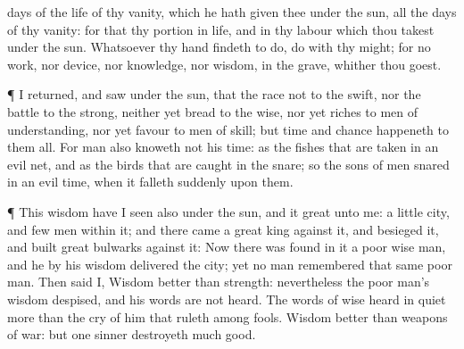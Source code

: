 {days of the
life of thy
vanity, which he hath
given thee under the
sun, all the
days of thy
vanity: for that
{} thy
portion in
{}
life, and in thy
labour which thou
takest under the
sun.
Whatsoever thy
hand
findeth to
do,
do
{} with thy
might; for
{} no
work, nor
device, nor
knowledge, nor
wisdom, in the
grave, whither thou
goest.
\par }{\PP {}¶ I
returned, and
saw under the
sun, that the
race
{} not to the
swift, nor the
battle to the
strong, neither yet
bread to the
wise, nor yet
riches to men of
understanding, nor yet
favour to men of
skill; but
time and
chance
happeneth to them all.
For
man also
knoweth not his
time: as the
fishes that are
taken in an
evil
net, and as the
birds that are
caught in the
snare;
so
{} the
sons of
men
snared in an
evil
time, when it
falleth
suddenly upon them.
\par }{\PP {}¶
This
wisdom have I
seen also under the
sun, and it
{}
great unto me:
 a
little
city, and
few
men within it; and there
came a
great
king against it, and
besieged it, and
built
great
bulwarks against it:
Now there was
found in it a
poor
wise
man, and he by his
wisdom
delivered the
city; yet no
man
remembered that same
poor
man.
Then
said I,
Wisdom
{}
better than
strength: nevertheless the poor
man’s
wisdom
{}
despised, and his
words are not
heard.
The
words of
wise
{}
heard in
quiet more than the
cry of him that
ruleth among
fools.
Wisdom
{}
better than
weapons of
war: but
one
sinner
destroyeth
much
good.

}
